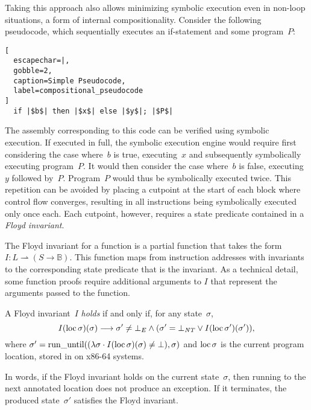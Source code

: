 Taking this approach also allows minimizing symbolic execution
even in non-loop situations, a form of internal compositionality.
Consider the following pseudocode,
which sequentially executes an if-statement and some program~$P$:
\begin{lstlisting}[
  escapechar=|,
  gobble=2,
  caption=Simple Pseudocode,
  label=compositional_pseudocode
]
  if |$b$| then |$x$| else |$y$|; |$P$|
\end{lstlisting}
The assembly corresponding to this code can be verified using symbolic execution.
If executed in full, the symbolic execution engine
would require first considering the case where~$b$ is true,
executing~$x$ and subsequently symbolically executing program~$P$.
It would then consider the case where~$b$ is false, executing~$y$ followed by~$P$.
Program~$P$ would thus be symbolically executed twice.
This repetition can be avoided
by placing a cutpoint at the start of each block where control flow converges,%
resulting in all instructions being symbolically executed only once each.
Each cutpoint, however, requires a state predicate contained
in a \emph{Floyd invariant}.

The Floyd invariant for a function is a partial function
that takes the form $I:L\rightharpoonup(S\rightarrow\mathbb{B})$.%
%
This function maps from instruction addresses with invariants
to the corresponding state predicate that is the invariant.
As a technical detail, some function proofs require additional arguments to $I$
that represent the arguments passed to the function.
\begin{definition}\label{def:floyd_inv}
  A Floyd invariant~$I$ \emph{holds} if and only if, for any state~$\sigma$,
  \begin{equation}
    I(\operatorname{loc}\sigma)(\sigma)\longrightarrow
    \sigma'\neq\bot_E\wedge(\sigma'=\bot_{\mathit{NT}}\vee I(\operatorname{loc}\sigma')(\sigma')),
  \end{equation}
  where
  $\sigma'=\operatorname{run\_until}((\lambda\sigma\cdot I(\operatorname{loc}\sigma)(\sigma)\neq\bot),\sigma)$%
  and $\operatorname{loc}\sigma$ is the current program location,
  stored in  on x86-64 systems.
\end{definition}
In words, if the Floyd invariant holds on the current state~$\sigma$,
then running to the next annotated location does not produce an exception.
If it terminates, the produced state~$\sigma'$ satisfies the Floyd invariant.


